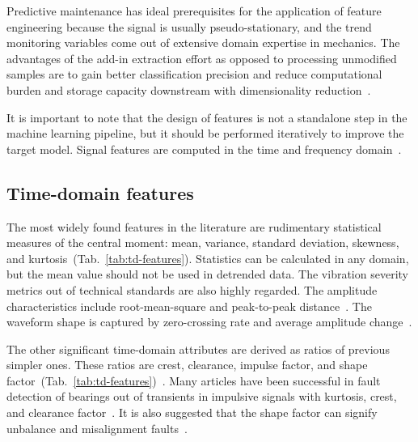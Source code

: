 Predictive maintenance has ideal prerequisites for the application of feature engineering because the signal is usually pseudo-stationary, and the trend monitoring variables come out of extensive domain expertise in mechanics. The advantages of the add-in extraction effort as opposed to processing unmodified samples are to gain better classification precision and reduce computational burden and storage capacity downstream with dimensionality reduction~\cite{johnson_feature_2019}. 

It is important to note that the design of features is not a standalone step in the machine learning pipeline, but it should be performed iteratively to improve the target model. Signal features are computed in the time and frequency domain~\cite{brito_fault_2021}.

\subsection{Time-domain features}
The most widely found features in the literature are rudimentary statistical measures of the central moment: mean, variance, standard deviation, skewness, and kurtosis~(Tab.~\ref{tab:td-features}). Statistics can be calculated in any domain, but the mean value should not be used in detrended data. The vibration severity metrics out of technical standards are also highly regarded. The amplitude characteristics include root-mean-square and peak-to-peak distance~\cite{mostafavi_novel_2021}. The waveform shape is captured by zero-crossing rate and average amplitude change~\cite{moctar_time-domain_2023}.

The other significant time-domain attributes are derived as ratios of previous simpler ones. These ratios are crest, clearance, impulse factor, and shape factor~(Tab.~\ref{tab:td-features})~\cite{nandi_condition_2019}. Many articles have been successful in fault detection of bearings out of transients in impulsive signals with kurtosis, crest, and clearance factor~\cite{brito_fault_2021}. It is also suggested that the shape factor can signify unbalance and misalignment faults~\cite{nandi_condition_2019}.

